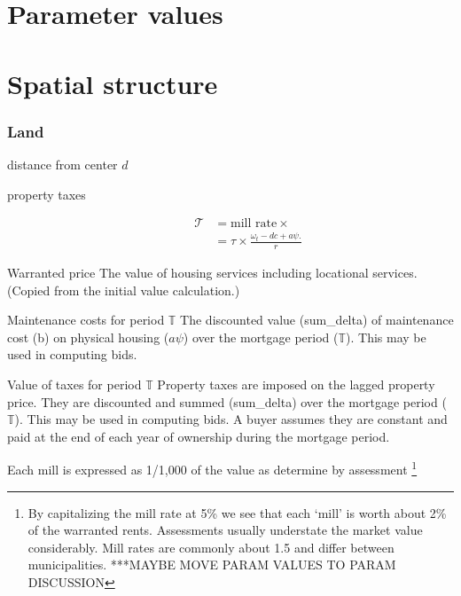 
\section{Parameter values}\label{sec-param-values}



\section{Spatial structure}

\subsubsection{Land}
\begin{description}
\item[distance from center  $d$] 
\end{description}


\begin{description}
\item[property taxes]
\begin{align*}
\mathcal{T} &= \text{mill rate} \times  \\
&= \tau \times \frac{\omega_t- {dc} + a\psi.}{r}
\end{align*}
\end{description}



{Warranted price} The value of housing services including locational services. (Copied from the initial value calculation.)

{Maintenance costs for period $\mathbb{T}$} The discounted value (sum\_delta) of maintenance cost (b) on  physical housing ($a\psi$) over the mortgage period ($\mathbb{T}$). This may be used in computing bids.

{Value of taxes for period $\mathbb{T}$}
Property taxes are imposed on the  lagged property price. They  are discounted and summed (sum\_delta)  over the mortgage period ($\mathbb{T}$). This may be used in computing bids. A buyer assumes they are constant and paid at the end of each year of ownership during the mortgage period.

Each mill is expressed as  1/1,000 of the value as determine by assessment \footnote{By capitalizing the mill rate at 5\%  we see that each `mill' is worth about 2\% of the warranted rents. Assessments usually understate the market value considerably. Mill rates are commonly about 1.5 and differ between municipalities. ***MAYBE MOVE PARAM VALUES TO PARAM DISCUSSION}


